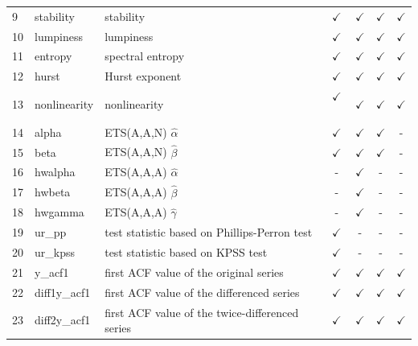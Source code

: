 \documentclass[11pt,a4paper,]{article}
\def\yes{$\checkmark$}
\theoremstyle{definition}
\theoremstyle{definition}
\theoremstyle{definition}
\theoremstyle{remark}
\begin{document}
\begin{table}[!htp]
\begin{tabular}{llp{}cccc}
9  & stability      & stability                                                                               & \yes  & \yes & \yes & \yes\\
10  & lumpiness      & lumpiness                                                                               & \yes  & \yes & \yes & \yes\\
11 & entropy        & spectral entropy                                                                        & \yes  & \yes & \yes & \yes\\
12 & hurst          & Hurst exponent                                                                          & \yes  & \yes & \yes & \yes\\
13 & nonlinearity   & nonlinearity                                                                            & \yes\ & \yes & \yes & \yes\\
14 & alpha          & ETS(A,A,N) $\hat\alpha$                                                                 & \yes  & \yes & \yes & -\\
15 & beta           & ETS(A,A,N) $\hat\beta$                                                                  & \yes  & \yes & \yes & - \\
16 & hwalpha        & ETS(A,A,A) $\hat\alpha$                                                                 & -     & \yes & - & -\\
17 & hwbeta         & ETS(A,A,A) $\hat\beta$                                                                  & -     & \yes & - & - \\
18 & hwgamma        & ETS(A,A,A) $\hat\gamma$                                                                 & -     & \yes & - &-\\
19 & ur\_pp         & test statistic based on Phillips-Perron test                                            & \yes  & - & - & - \\
20 & ur\_kpss       & test statistic based on KPSS test                                                       & \yes  & - & - & - \\
21 & y\_acf1        & first ACF value of the original series                                                  & \yes  & \yes & \yes & \yes\\
22 & diff1y\_acf1   & first ACF value of the differenced series                                               & \yes  & \yes & \yes & \yes\\
23 & diff2y\_acf1   & first ACF value of the twice-differenced series                                         & \yes  & \yes & \yes & \yes\\

\end{tabular}
\end{table}
\end{document}
